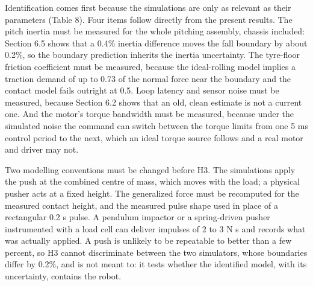 \documentclass[11pt,a4paper]{article}
\begin{document}
Identification comes first because the simulations are only as relevant as their parameters (Table 8). Four items follow directly from the present results. The pitch inertia must be measured for the whole pitching assembly, chassis included: Section 6.5 shows that a 0.4\% inertia difference moves the fall boundary by about 0.2\%, so the boundary prediction inherits the inertia uncertainty. The tyre-floor friction coefficient must be measured, because the ideal-rolling model implies a traction demand of up to 0.73 of the normal force near the boundary and the contact model fails outright at 0.5. Loop latency and sensor noise must be measured, because Section 6.2 shows that an old, clean estimate is not a current one. And the motor's torque bandwidth must be measured, because under the simulated noise the command can switch between the torque limits from one 5 ms control period to the next, which an ideal torque source follows and a real motor and driver may not.

Two modelling conventions must be changed before H3. The simulations apply the push at the combined centre of mass, which moves with the load; a physical pusher acts at a fixed height. The generalized force must be recomputed for the measured contact height, and the measured pulse shape used in place of a rectangular 0.2 s pulse. A pendulum impactor or a spring-driven pusher instrumented with a load cell can deliver impulses of 2 to 3 N s and records what was actually applied. A push is unlikely to be repeatable to better than a few percent, so H3 cannot discriminate between the two simulators, whose boundaries differ by 0.2\%, and is not meant to: it tests whether the identified model, with its uncertainty, contains the robot.
\end{document}
